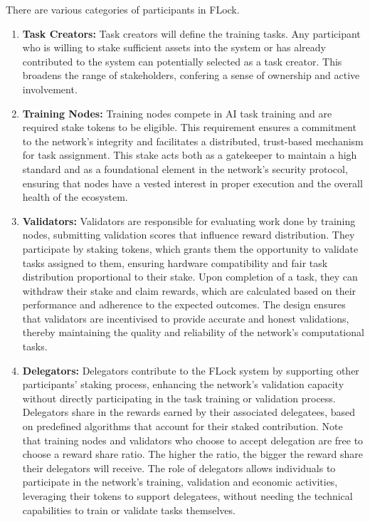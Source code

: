 \documentclass[conference]{IEEEtran}
\begin{document}
There are various categories of participants in FLock.
\begin{enumerate}
    \item \textbf{Task Creators:} Task creators will define the training tasks. Any participant who is willing to stake sufficient assets into the system or has already contributed to the system can potentially selected as a task creator. This broadens the range of stakeholders, confering a sense of ownership and active involvement.
    
    \item \textbf{Training Nodes:} Training nodes compete in AI task training and are required stake tokens to be eligible. This requirement ensures a commitment to the network's integrity and facilitates a distributed, trust-based mechanism for task assignment. This stake acts both as a gatekeeper to maintain a high standard and as a foundational element in the network's security protocol, ensuring that nodes have a vested interest in proper execution and the overall health of the ecosystem.


    \item \textbf{Validators:} Validators are responsible for evaluating work done by training nodes, submitting validation scores that influence reward distribution.  They participate by staking tokens, which grants them the opportunity to validate tasks assigned to them, ensuring hardware compatibility and fair task distribution proportional to their stake.  Upon completion of a task, they can withdraw their stake and claim rewards, which are calculated based on their performance and adherence to the expected outcomes. The design ensures that validators are incentivised to provide accurate and honest validations, thereby maintaining the quality and reliability of the network's computational tasks.
    
    \item \textbf{Delegators:} Delegators contribute to the FLock system by supporting other participants' staking process, enhancing the network's validation capacity without directly participating in the task training or validation process. Delegators share in the rewards earned by their associated delegatees, based on predefined algorithms that account for their staked contribution. Note that training nodes and validators who choose to accept delegation are free to choose a reward share ratio. The higher the ratio, the bigger the reward share their delegators will receive. The role of delegators allows individuals to participate in the network's training, validation and economic activities, leveraging their tokens to support delegatees, without needing the technical capabilities to train or validate tasks themselves.


\end{enumerate}
\end{document}
